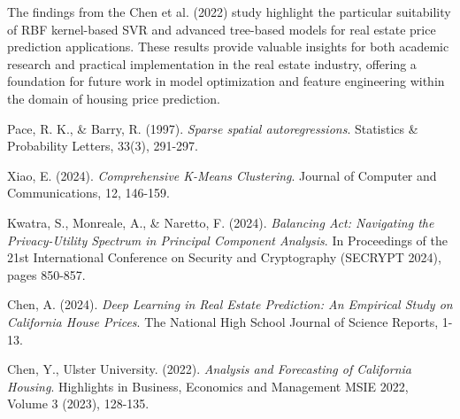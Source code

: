\documentclass[a4paper, 11pt]{article}
\begin{document}
The findings from the Chen et al. (2022) study highlight the particular suitability of RBF kernel-based SVR and advanced tree-based models for real estate price prediction applications. These results provide valuable insights for both academic research and practical implementation in the real estate industry, offering a foundation for future work in model optimization and feature engineering within the domain of housing price prediction.\begin{thebibliography}{9}

Pace, R. K., \& Barry, R. (1997).
\textit{Sparse spatial autoregressions}.
Statistics \& Probability Letters, 33(3), 291-297.

Xiao, E. (2024).
\textit{Comprehensive K-Means Clustering}.
Journal of Computer and Communications, 12, 146-159.

Kwatra, S., Monreale, A., \& Naretto, F. (2024).
\textit{Balancing Act: Navigating the Privacy-Utility Spectrum in Principal Component Analysis}.
In Proceedings of the 21st International Conference on Security and Cryptography (SECRYPT 2024), pages 850-857.

Chen, A. (2024).
\textit{Deep Learning in Real Estate Prediction: An Empirical Study on California House Prices}.
The National High School Journal of Science Reports, 1-13.

Chen, Y., Ulster University. (2022).
\textit{Analysis and Forecasting of California Housing}.
Highlights in Business, Economics and Management MSIE 2022, Volume 3 (2023), 128-135.

\end{thebibliography}
\end{document}
